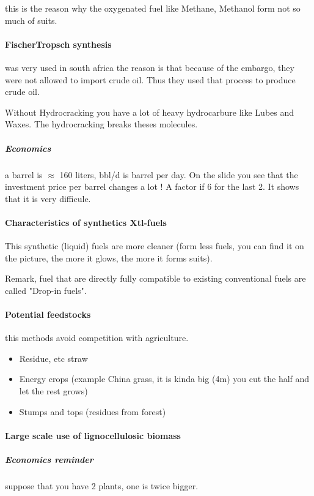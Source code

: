 \documentclass[10pt,a4paper]{article}
\begin{document}
this is the reason why the oxygenated fuel like Methane, Methanol form not so much of suits. 

\paragraph{FischerTropsch synthesis} was very used in south africa the reason is that because of the embargo, they were not allowed to import crude oil. Thus they used that process to produce crude oil.

Without Hydrocracking you have a lot of heavy hydrocarbure like Lubes and Waxes. The hydrocracking breaks theses molecules.

\subparagraph{Economics} a barrel is $\approx$ 160 liters, bbl/d is barrel per day. On the slide you see that the investment price per barrel changes a lot ! A factor if 6 for the last 2. It shows that it is very difficule.

\paragraph{Characteristics of synthetics Xtl-fuels}
This synthetic (liquid) fuels are more cleaner (form less fuels, you can find it on the picture, the more it glows, the more it forms suits).

Remark, fuel that are directly fully compatible to existing conventional fuels are called "Drop-in fuels".

\paragraph{Potential feedstocks} this methods avoid competition with agriculture.

\begin{itemize}
\item Residue, etc straw
\item Energy crops (example China grass, it is kinda big (4m) you cut the half and let the rest grows)
\item Stumps and tops (residues from forest)
\end{itemize}

\paragraph{Large scale use of lignocellulosic biomass}

\subparagraph{Economics reminder} suppose that you have 2 plants, one is twice bigger.
\end{document}
